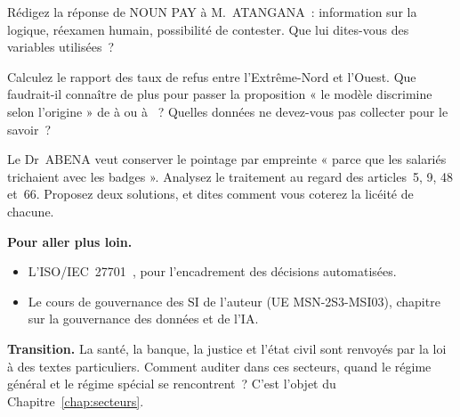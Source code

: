 \begin{boxexo}[title={\ding{45}\quad Exercice~17.2. Répondre à M. ATANGANA \niveaumoyen}]
Rédigez la réponse de NOUN PAY à M.~ATANGANA~: information sur la logique,
réexamen humain, possibilité de contester. Que lui dites-vous des variables
utilisées~?
\end{boxexo}

\begin{boxexo}[title={\ding{45}\quad Exercice~17.3. Les taux de refus \niveaumoyen}]
Calculez le rapport des taux de refus entre l'Extrême-Nord et l'Ouest. Que
faudrait-il connaître de plus pour passer la proposition « le modèle
discrimine selon l'origine » de \NEK{} à \OUI{} ou à \NON{}~? Quelles
données ne devez-vous pas collecter pour le savoir~?
\end{boxexo}

\begin{boxexo}[title={\ding{45}\quad Exercice~17.4. Le pointage biométrique \niveauexpert}]
Le Dr~ABENA veut conserver le pointage par empreinte « parce que les
salariés trichaient avec les badges ». Analysez le traitement au regard des
articles~5, 9, 48 et~66. Proposez deux solutions, et dites comment vous
coterez la licéité de chacune.
\end{boxexo}

\bigskip

\begin{boxinfo}
\textbf{Pour aller plus loin.}
\begin{itemize}
    \item L'ISO/IEC~27701~\cite{iso27701}, pour l'encadrement des
          décisions automatisées.
    \item Le cours de gouvernance des SI de l'auteur (UE MSN-2S3-MSI03),
          chapitre sur la gouvernance des données et de l'IA.
\end{itemize}
\end{boxinfo}

\begin{boxinfo}
\textbf{Transition.} La santé, la banque, la justice et l'état civil sont
renvoyés par la loi à des textes particuliers. Comment auditer dans ces
secteurs, quand le régime général et le régime spécial se rencontrent~?
C'est l'objet du Chapitre~\ref{chap:secteurs}.
\end{boxinfo}
